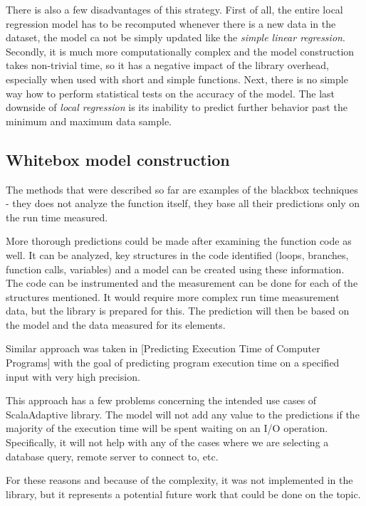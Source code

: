 
There is also a few disadvantages of this strategy. First of all, the entire local regression model has to be recomputed whenever there is a new data in the dataset, the model ca not be simply updated like the \textit{simple linear regression}. Secondly, it is much more computationally complex and the model construction takes non-trivial time, so it has a negative impact of the library overhead, especially when used with short and simple functions. Next, there is no simple way how to perform statistical tests on the accuracy of the model. The last downside of \textit{local regression} is its inability to predict further behavior past the minimum and maximum data sample.

\subsection{Whitebox model construction}

The methods that were described so far are examples of the blackbox techniques - they does not analyze the function itself, they base all their predictions only on the run time measured.

More thorough predictions could be made after examining the function code as well. It can be analyzed, key structures in the code identified (loops, branches, function calls, variables) and a model can be created using these information. The code can be instrumented and the measurement can be done for each of the structures mentioned. It would require more complex run time measurement data, but the library is prepared for this. The prediction will then be based on the model and the data measured for its elements.

Similar approach was taken in [Predicting Execution Time of Computer Programs] with the goal of predicting program execution time on a specified input with very high precision.

This approach has a few problems concerning the intended use cases of ScalaAdaptive library. The model will not add any value to the predictions if the majority of the execution time will be spent waiting on an I/O operation. Specifically, it will not help with any of the cases where we are selecting a database query, remote server to connect to, etc.

For these reasons and because of the complexity, it was not implemented in the library, but it represents a potential future work that could be done on the topic.

